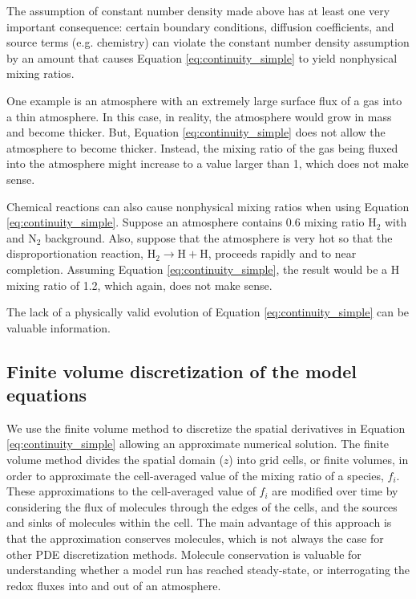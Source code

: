 \documentclass{article}
\begin{document}

The assumption of constant number density made above has at least one very important consequence: certain boundary conditions, diffusion coefficients, and source terms (e.g. chemistry) can violate the constant number density assumption by an amount that causes Equation \eqref{eq:continuity_simple} to yield nonphysical mixing ratios. 

One example is an atmosphere with an extremely large surface flux of a gas into a thin atmosphere. In this case, in reality, the atmosphere would grow in mass and become thicker. But, Equation \eqref{eq:continuity_simple} does not allow the atmosphere to become thicker. Instead, the mixing ratio of the gas being fluxed into the atmosphere might increase to a value larger than 1, which does not make sense.

Chemical reactions can also cause nonphysical mixing ratios when using Equation \eqref{eq:continuity_simple}. Suppose an atmosphere contains 0.6 mixing ratio H$_2$ with and N$_2$ background. Also, suppose that the atmosphere is very hot so that the disproportionation reaction, $\mathrm{H_2} \rightarrow \mathrm{H} + \mathrm{H}$, proceeds rapidly and to near completion. Assuming Equation \eqref{eq:continuity_simple}, the result would be a H mixing ratio of 1.2, which again, does not make sense.

The lack of a physically valid evolution of Equation \eqref{eq:continuity_simple} can be valuable information.

\subsection{Finite volume discretization of the model equations} \label{sec:finite_volume}

We use the finite volume method to discretize the spatial derivatives in Equation \eqref{eq:continuity_simple} allowing an approximate numerical solution. The finite volume method divides the spatial domain ($z$) into grid cells, or finite volumes, in order to approximate the cell-averaged value of the mixing ratio of a species, $f_i$. These approximations to the cell-averaged value of $f_i$ are modified over time by considering the flux of molecules through the edges of the cells, and the sources and sinks of molecules within the cell. The main advantage of this approach is that the approximation conserves molecules, which is not always the case for other PDE discretization methods. Molecule conservation is valuable for understanding whether a model run has reached steady-state, or interrogating the redox fluxes into and out of an atmosphere.
\end{document}
